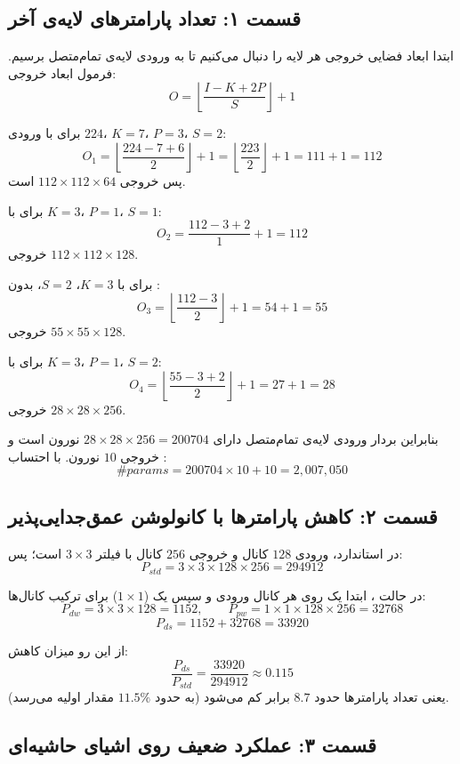 \subsection*{قسمت ۱: تعداد پارامترهای لایه‌ی آخر}

ابتدا ابعاد فضایی خروجی هر لایه را دنبال می‌کنیم تا به ورودی لایه‌ی تمام‌متصل برسیم. فرمول ابعاد خروجی:
$$O = \left\lfloor \frac{I - K + 2P}{S} \right\rfloor + 1$$

برای  با ورودی $224$، $K=7$، $P=3$، $S=2$:
$$O_1 = \left\lfloor \frac{224 - 7 + 6}{2} \right\rfloor + 1 = \left\lfloor \frac{223}{2} \right\rfloor + 1 = 111 + 1 = 112$$
پس خروجی $112 \times 112 \times 64$ است.

برای  با $K=3$، $P=1$، $S=1$:
$$O_2 = \frac{112 - 3 + 2}{1} + 1 = 112$$
خروجی $112 \times 112 \times 128$.

برای  با $K=3$، $S=2$، بدون :
$$O_3 = \left\lfloor \frac{112 - 3}{2} \right\rfloor + 1 = 54 + 1 = 55$$
خروجی $55 \times 55 \times 128$.

برای  با $K=3$، $P=1$، $S=2$:
$$O_4 = \left\lfloor \frac{55 - 3 + 2}{2} \right\rfloor + 1 = 27 + 1 = 28$$
خروجی $28 \times 28 \times 256$.

بنابراین بردار ورودی لایه‌ی تمام‌متصل دارای $28 \times 28 \times 256 = 200704$ نورون است و خروجی $10$ نورون. با احتساب :
$$\#params = 200704 \times 10 + 10 = 2{,}007{,}050$$

\subsection*{قسمت ۲: کاهش پارامترها با کانولوشن عمق‌جدایی‌پذیر}

در  استاندارد، ورودی $128$ کانال و خروجی $256$ کانال با فیلتر $3\times 3$ است؛ پس:
$$P_{std} = 3 \times 3 \times 128 \times 256 = 294912$$

در حالت ، ابتدا یک  روی هر کانال ورودی و سپس یک  ($1\times1$) برای ترکیب کانال‌ها:
$$P_{dw} = 3 \times 3 \times 128 = 1152, \qquad P_{pw} = 1 \times 1 \times 128 \times 256 = 32768$$
$$P_{ds} = 1152 + 32768 = 33920$$

از این رو میزان کاهش:
$$\frac{P_{ds}}{P_{std}} = \frac{33920}{294912} \approx 0.115$$
یعنی تعداد پارامترها حدود $8.7$ برابر کم می‌شود (به حدود $11.5\%$ مقدار اولیه می‌رسد).

\subsection*{قسمت ۳: عملکرد ضعیف روی اشیای حاشیه‌ای}

